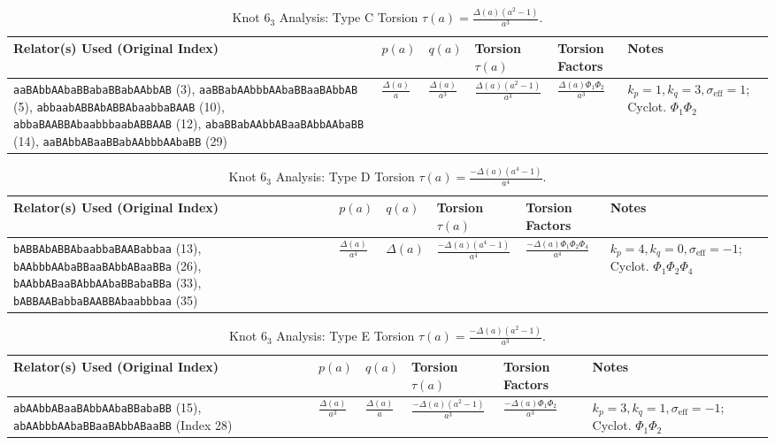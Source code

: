 \documentclass{article}
\begin{document}
\begin{table}[htbp]
\centering
\caption{Knot $6_3$ Analysis: Type C Torsion $\tau(a) = \frac{\Delta(a)(a^2-1)}{a^3}$.}
\label{tab:knot63_type_C}
\scriptsize
\begin{tabular}{@{}p{4.0cm} p{1.8cm} p{1.8cm} p{2.2cm} p{3.0cm} p{3.2cm}@{}}
\toprule
\textbf{Relator(s) Used (Original Index)} & \textbf{$p(a)$} & \textbf{$q(a)$} & \textbf{Torsion $\tau(a)$} & \textbf{Torsion Factors} & \textbf{Notes} \\
\midrule
\texttt{aaBAbbAAbaBBabaBBabAAbbAB} (3), \texttt{aaBBabAAbbbAAbaBBaaBAbbAB} (5), \texttt{abbaabABBAbABBAbaabbaBAAB} (10), \texttt{abbaBAABBAbaabbbaabABBAAB} (12), \texttt{abaBBabAAbbABaaBAbbAAbaBB} (14), \texttt{aaBAbbABaaBBabAAbbbAAbaBB} (29)
& $\frac{\Delta(a)}{a}$ & $\frac{\Delta(a)}{a^3}$ & $\frac{\Delta(a)(a^2-1)}{a^3}$ & $\frac{\Delta(a)\Phi_1\Phi_2}{a^3}$ & $k_p=1, k_q=3, \sigma_{\text{eff}}=1$; Cyclot. $\Phi_1\Phi_2$ \\
\bottomrule
\end{tabular}
\end{table}

\begin{table}[htbp]
\centering
\caption{Knot $6_3$ Analysis: Type D Torsion $\tau(a) = \frac{-\Delta(a)(a^4-1)}{a^4}$.}
\label{tab:knot63_type_D}
\scriptsize
\begin{tabular}{@{}p{4.0cm} p{1.8cm} p{1.8cm} p{2.2cm} p{3.0cm} p{3.2cm}@{}}
\toprule
\textbf{Relator(s) Used (Original Index)} & \textbf{$p(a)$} & \textbf{$q(a)$} & \textbf{Torsion $\tau(a)$} & \textbf{Torsion Factors} & \textbf{Notes} \\
\midrule
\texttt{bABBAbABBAbaabbaBAABabbaa} (13), \texttt{bAAbbbAAbaBBaaBAbbABaaBBa} (26), \texttt{bAAbbABaaBAbbAAbaBBabaBBa} (33), \texttt{bABBAABabbaBAABBAbaabbbaa} (35)
& $\frac{\Delta(a)}{a^4}$ & $\Delta(a)$ & $\frac{-\Delta(a)(a^4-1)}{a^4}$ & $\frac{-\Delta(a)\Phi_1\Phi_2\Phi_4}{a^4}$ & $k_p=4, k_q=0, \sigma_{\text{eff}}=-1$; Cyclot. $\Phi_1\Phi_2\Phi_4$ \\
\bottomrule
\end{tabular}
\end{table}

\begin{table}[htbp]
\centering
\caption{Knot $6_3$ Analysis: Type E Torsion $\tau(a) = \frac{-\Delta(a)(a^2-1)}{a^3}$.}
\label{tab:knot63_type_E}
\scriptsize
\begin{tabular}{@{}p{4.0cm} p{1.8cm} p{1.8cm} p{2.2cm} p{3.0cm} p{3.2cm}@{}}
\toprule
\textbf{Relator(s) Used (Original Index)} & \textbf{$p(a)$} & \textbf{$q(a)$} & \textbf{Torsion $\tau(a)$} & \textbf{Torsion Factors} & \textbf{Notes} \\
\midrule
\texttt{abAAbbABaaBAbbAAbaBBabaBB} (15), \texttt{abAAbbbAAbaBBaaBAbbABaaBB} (Index 28)
& $\frac{\Delta(a)}{a^3}$ & $\frac{\Delta(a)}{a}$ & $\frac{-\Delta(a)(a^2-1)}{a^3}$ & $\frac{-\Delta(a)\Phi_1\Phi_2}{a^3}$ & $k_p=3, k_q=1, \sigma_{\text{eff}}=-1$; Cyclot. $\Phi_1\Phi_2$ \\
\bottomrule
\end{tabular}
\end{table}
\end{document}
